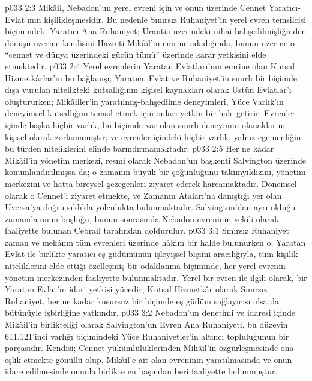 \vs p033 2:3 Mikâil, Nebadon’un yerel evreni için ve onun üzerinde Cennet Yaratıcı\hyp{}Evlat’ının kişilikleşmesidir. Bu nedenle Sınırsız Ruhaniyet’in yerel evren temsilcisi biçimindeki Yaratıcı Ana Ruhaniyet; Urantia üzerindeki nihai bahşedilmişliğinden dönüşü üzerine kendisini Hazreti Mikâil’in emrine adadığında, bunun üzerine o “cennet ve dünya üzerindeki gücün tümü” üzerinde karar yetkisini elde etmektedir.
\vs p033 2:4 Yerel evrenlerin Yaratan Evlatları’nın emrine olan Kutsal Hizmetkârlar’ın bu bağlanışı; Yaratıcı, Evlat ve Ruhaniyet’in sınırlı bir biçimde dışa vurulan nitelikteki kutsallığının kişisel kaynakları olarak Üstün Evlatlar’ı oluştururken; Mikâiller’in yaratılmış\hyp{}bahşedilme deneyimleri, Yüce Varlık’ın deneyimsel kutsallığını temsil etmek için onları yetkin bir hale getirir. Evrenler içinde başka hiçbir varlık, bu biçimde var olan sınırlı deneyimin olanaklarını kişisel olarak zorlamamıştır; ve evrenler içindeki hiçbir varlık, yalnız egemenliğin bu türden niteliklerini elinde barındırmamaktadır.
\vs p033 2:5 Her ne kadar Mikâil’in yönetim merkezi, resmi olarak Nebadon’un başkenti Salvington üzerinde konumlandırılmışsa da; o zamanın büyük bir çoğunluğunu takımyıldızını, yönetim merkezini ve hatta bireysel gezegenleri ziyaret ederek harcamaktadır. Dönemsel olarak o Cennet’i ziyaret etmekte, ve Zamanın Ataları’na danıştığı yer olan Uversa’ya doğru sıklıkla yolculukta bulunmaktadır. Salvington’dan ayrı olduğu zamanda onun boşluğu, bunun sonrasında Nebadon evreninin vekili olarak faaliyette bulunan Cebrail tarafından doldurulur.
\vs p033 3:1 Sınırsız Ruhaniyet zaman ve mekânın tüm evrenleri üzerinde hâkim bir halde bulunurken o; Yaratan Evlat ile birlikte yaratıcı eş güdümünün işleyişsel biçimi aracılığıyla, tüm kişilik niteliklerini elde ettiği özelleşmiş bir odaklanma biçiminde, her yerel evrenin yönetim merkezinden faaliyette bulunmaktadır. Yerel bir evren ile ilgili olarak, bir Yaratan Evlat’ın idari yetkisi yücedir; Kutsal Hizmetkâr olarak Sınırsız Ruhaniyet, her ne kadar kusursuz bir biçimde eş güdüm sağlayıcısı olsa da bütünüyle işbirliğine yatkındır.
\vs p033 3:2 Nebadon’un denetimi ve idaresi içinde Mikâil’in birlikteliği olarak Salvington’un Evren Ana Ruhaniyeti, bu düzeyin 611.121’inci varlığı biçimindeki Yüce Ruhaniyetler’in altıncı topluluğunun bir parçasıdır. Kendisi; Cennet yükümlülüklerinden Mikâil’in özgürleşmesinde ona eşlik etmekte gönüllü olup, Mikâil’e ait olan evreninin yaratılmasında ve onun idare edilmesinde onunla birlikte en başından beri faaliyette bulunmuştur.
